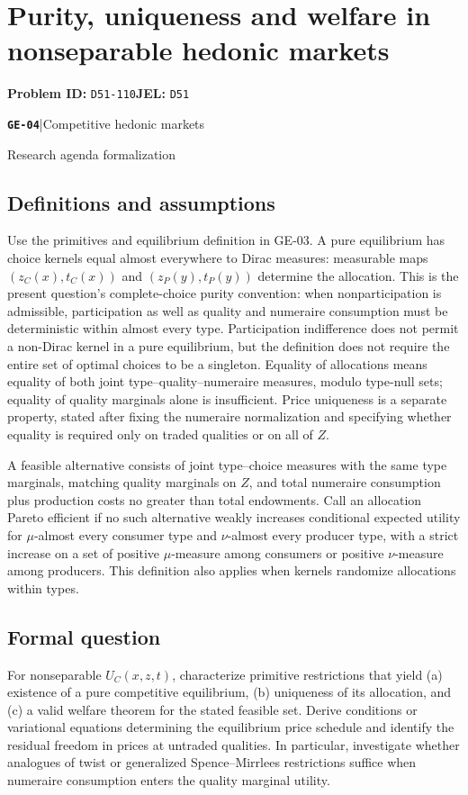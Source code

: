 \documentclass[11pt,a4paper]{article}
\newcommand{\entrymeta}[3]{{\sffamily\small\color{muted}\textbf{\texttt{#1}}\quad|\quad #2\par #3\par}}
\begin{document}
\section*{Purity, uniqueness and welfare in nonseparable hedonic markets}
\textbf{Problem ID:} \texttt{D51-110}\quad \textbf{JEL:} \texttt{D51}\par
\label{problem:OP-0576}
\label{beyond:GE-04}
\entrymeta{GE-04}{Competitive hedonic markets}{Research agenda formalization}
\subsection*{Definitions and assumptions}
Use the primitives and equilibrium definition in GE-03. A pure equilibrium has choice kernels equal almost everywhere to Dirac measures: measurable maps $(z_C(x),t_C(x))$ and $(z_P(y),t_P(y))$ determine the allocation. This is the present question's complete-choice purity convention: when nonparticipation is admissible, participation as well as quality and numeraire consumption must be deterministic within almost every type. Participation indifference does not permit a non-Dirac kernel in a pure equilibrium, but the definition does not require the entire set of optimal choices to be a singleton. Equality of allocations means equality of both joint type--quality--numeraire measures, modulo type-null sets; equality of quality marginals alone is insufficient. Price uniqueness is a separate property, stated after fixing the numeraire normalization and specifying whether equality is required only on traded qualities or on all of $Z$.

A feasible alternative consists of joint type--choice measures with the same type marginals, matching quality marginals on $Z$, and total numeraire consumption plus production costs no greater than total endowments. Call an allocation Pareto efficient if no such alternative weakly increases conditional expected utility for $\mu$-almost every consumer type and $\nu$-almost every producer type, with a strict increase on a set of positive $\mu$-measure among consumers or positive $\nu$-measure among producers. This definition also applies when kernels randomize allocations within types.
\subsection*{Formal question}
For nonseparable $U_C(x,z,t)$, characterize primitive restrictions that yield (a) existence of a pure competitive equilibrium, (b) uniqueness of its allocation, and (c) a valid welfare theorem for the stated feasible set. Derive conditions or variational equations determining the equilibrium price schedule and identify the residual freedom in prices at untraded qualities. In particular, investigate whether analogues of twist or generalized Spence--Mirrlees restrictions suffice when numeraire consumption enters the quality marginal utility.
\end{document}

